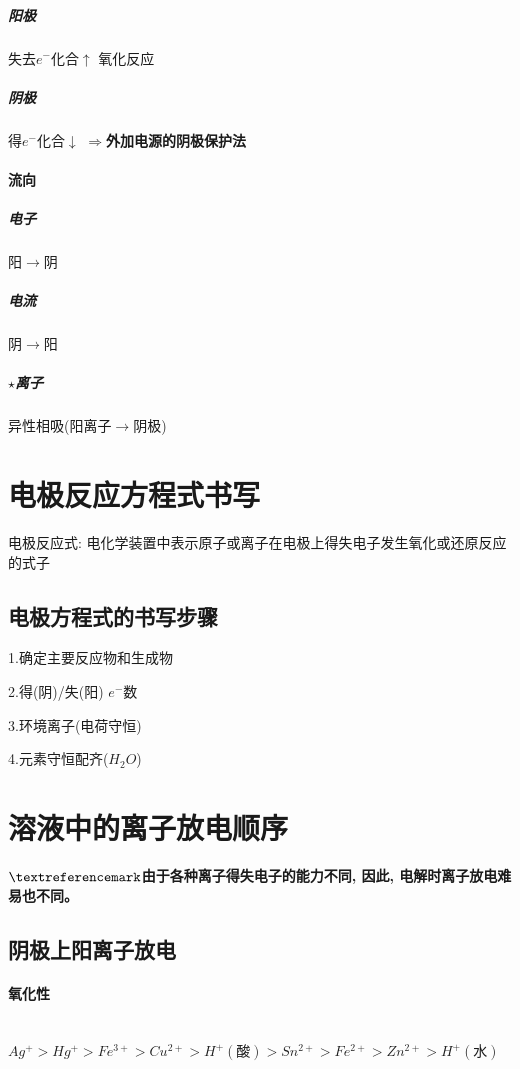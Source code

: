 \documentclass[10pt,cn]{elegantbook}
\begin{document}
\subparagraph{阳极}
失去$e^{-}$化合$\uparrow$ 氧化反应
\subparagraph{阴极}
得$e^{-}$化合$\downarrow$ $\Rightarrow$\textbf{外加电源的阴极保护法}

\paragraph{流向}

\subparagraph*{电子}

阳$\rightarrow$阴

\subparagraph*{电流}

阴$\rightarrow$阳

\subparagraph*{$\star$离子}

异性相吸(阳离子$\rightarrow$阴极)

\section{电极反应方程式书写}

电极反应式: 电化学装置中表示原子或离子在电极上得失电子发生氧化或还原反应的式子

\subsection{电极方程式的书写步骤}

1.确定主要反应物和生成物

2.得(阴)/失(阳)  $e^{-}$数

3.环境离子(电荷守恒)

4.元素守恒配齐($H_{2}O$)

\section{溶液中的离子放电顺序}

\textbf{$\textreferencemark$由于各种离子得失电子的能力不同, 因此, 电解时离子放电难易也不同。}

\subsection{阴极上阳离子放电}

\paragraph*{氧化性}~{}\\

$Ag^{+} > Hg^{+} > Fe^{3+} > Cu^{2+} > H^{+}(\mbox{酸}) > Sn^{2+} > Fe^{2+} > Zn^{2+} > H^{+}(\mbox{水})$
\end{document}
